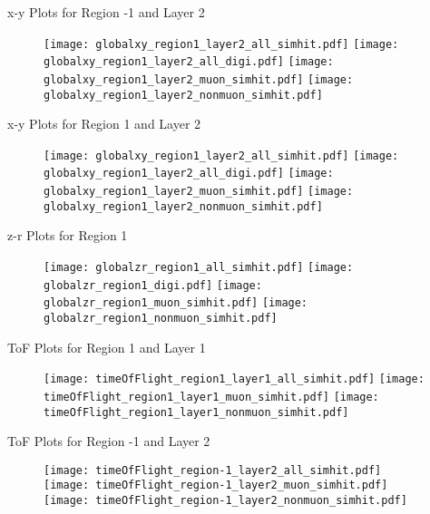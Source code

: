 \documentclass[11pt,a4paper]{beamer}
\begin{document}
\begin{frame}{x-y Plots for Region -1 and Layer 2}
\begin{figure}[htbp]
\hill
\texttt{[image: globalxy\_region1\_layer2\_all\_simhit.pdf]} 
\hfill
\texttt{[image: globalxy\_region1\_layer2\_all\_digi.pdf]}
\hfill
\texttt{[image: globalxy\_region1\_layer2\_muon\_simhit.pdf]} 
\hfill
\texttt{[image: globalxy\_region1\_layer2\_nonmuon\_simhit.pdf]}
\hfill
\end{figure}
\end{frame}

\begin{frame}{x-y Plots for Region 1 and Layer 2}
\begin{figure}[htbp]
\hill
\texttt{[image: globalxy\_region1\_layer2\_all\_simhit.pdf]} 
\hfill
\texttt{[image: globalxy\_region1\_layer2\_all\_digi.pdf]}
\hfill
\texttt{[image: globalxy\_region1\_layer2\_muon\_simhit.pdf]} 
\hfill
\texttt{[image: globalxy\_region1\_layer2\_nonmuon\_simhit.pdf]}
\hfill
\end{figure}
\end{frame}

\begin{frame}{z-r Plots for Region 1}
\begin{figure}[htbp]
\hfill
\texttt{[image: globalzr\_region1\_all\_simhit.pdf]} 
\hfill
\texttt{[image: globalzr\_region1\_digi.pdf]}
\hfill
\texttt{[image: globalzr\_region1\_muon\_simhit.pdf]} 
\hfill
\texttt{[image: globalzr\_region1\_nonmuon\_simhit.pdf]}
\hfill
\end{figure}
\end{frame}

\begin{frame}{ToF Plots for Region 1 and Layer 1}
\begin{figure}[htbp]
\hfill
\texttt{[image: timeOfFlight\_region1\_layer1\_all\_simhit.pdf]} 
\hfill
\texttt{[image: timeOfFlight\_region1\_layer1\_muon\_simhit.pdf]}
\hfill
\texttt{[image: timeOfFlight\_region1\_layer1\_nonmuon\_simhit.pdf]} 
\hfill
\end{figure}
\end{frame}

\begin{frame}{ToF Plots for Region -1 and Layer 2}
\begin{figure}[htbp]
\hfill
\texttt{[image: timeOfFlight\_region-1\_layer2\_all\_simhit.pdf]} 
\hfill
\texttt{[image: timeOfFlight\_region-1\_layer2\_muon\_simhit.pdf]}
\hfill
\texttt{[image: timeOfFlight\_region-1\_layer2\_nonmuon\_simhit.pdf]} 
\hfill
\end{figure}
\end{frame}
\end{document}
